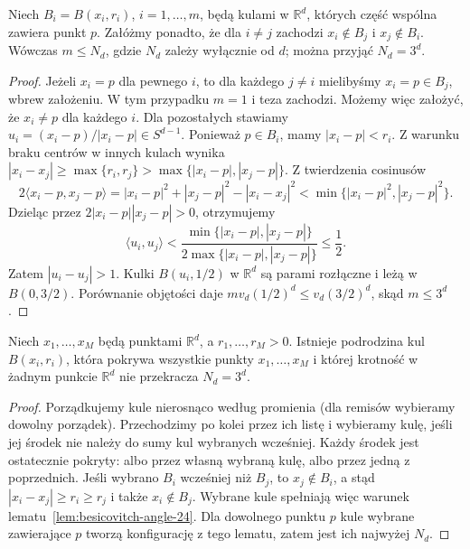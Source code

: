 \begin{lemat}
\label{lem:besicovitch-angle-24}
Niech $B_i=B(x_i,r_i)$, $i=1,\ldots,m$, będą kulami
w $\mathbb R^d$, których część wspólna zawiera punkt $p$.
Załóżmy ponadto, że dla $i\ne j$ zachodzi
$x_i\notin B_j$ i $x_j\notin B_i$.
Wówczas $m\le N_d$, gdzie $N_d$ zależy wyłącznie od $d$;
można przyjąć $N_d=3^d$.
\end{lemat}
\begin{proof}
Jeżeli $x_i=p$ dla pewnego $i$, to dla każdego $j\ne i$
mielibyśmy $x_i=p\in B_j$, wbrew założeniu.
W tym przypadku $m=1$ i teza zachodzi.
Możemy więc założyć, że $x_i\ne p$ dla każdego $i$.
Dla pozostałych stawiamy $u_i=(x_i-p)/|x_i-p|\in S^{d-1}$.
Ponieważ $p\in B_i$, mamy $|x_i-p|<r_i$.
Z warunku braku centrów w innych kulach wynika
$|x_i-x_j|\ge\max\{r_i,r_j\}>
\max\{|x_i-p|,|x_j-p|\}$.
Z twierdzenia cosinusów
\[
 2\langle x_i-p,x_j-p\rangle
 =|x_i-p|^2+|x_j-p|^2-|x_i-x_j|^2
 <\min\{|x_i-p|^2,|x_j-p|^2\}.
\]
Dzieląc przez $2|x_i-p||x_j-p|>0$, otrzymujemy
\[
 \langle u_i,u_j\rangle
 <\frac{\min\{|x_i-p|,|x_j-p|\}}
 {2\max\{|x_i-p|,|x_j-p|\}}\le\frac12.
\]
Zatem
$|u_i-u_j|>1$. Kulki $B(u_i,1/2)$ w $\mathbb R^d$
są parami rozłączne i leżą w $B(0,3/2)$.
Porównanie objętości daje
$m v_d(1/2)^d\le v_d(3/2)^d$, skąd $m\le3^d$.
\end{proof}

\begin{twierdzenie}
\label{thm:besicovitch-finite-24}
Niech $x_1,\ldots,x_M$ będą punktami $\mathbb R^d$,
a $r_1,\ldots,r_M>0$. Istnieje podrodzina kul
$B(x_i,r_i)$, która pokrywa wszystkie punkty
$x_1,\ldots,x_M$ i której krotność w żadnym punkcie
$\mathbb R^d$ nie przekracza $N_d=3^d$.
\end{twierdzenie}
\begin{proof}
Porządkujemy kule nierosnąco według promienia (dla remisów
wybieramy dowolny porządek). Przechodzimy po kolei przez
ich listę i wybieramy kulę, jeśli jej środek nie należy
do sumy kul wybranych wcześniej. Każdy środek jest ostatecznie
pokryty: albo przez własną wybraną kulę, albo przez jedną
z poprzednich. Jeśli wybrano $B_i$ wcześniej niż $B_j$,
to $x_j\notin B_i$, a stąd $|x_i-x_j|\ge r_i\ge r_j$
i także $x_i\notin B_j$. Wybrane kule spełniają więc
warunek lematu~\ref{lem:besicovitch-angle-24}.
Dla dowolnego punktu $p$ kule wybrane zawierające $p$
tworzą konfigurację z tego lematu, zatem jest ich najwyżej
$N_d$.
\end{proof}

